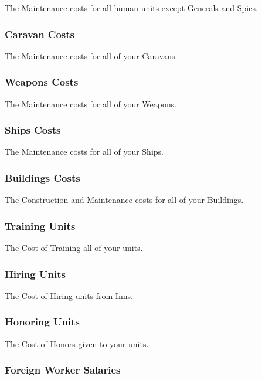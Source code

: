 The Maintenance costs for all human units except Generals and Spies.

\subsubsection{\textsf{Caravan Costs}}

The Maintenance costs for all of your Caravans.

\subsubsection{\textsf{Weapons Costs}}

The Maintenance costs for all of your Weapons.

\subsubsection{\textsf{Ships Costs}}

The Maintenance costs for all of your Ships.

\subsubsection{\textsf{Buildings Costs}}

The Construction and Maintenance costs for all of your Buildings.

\subsubsection{\textsf{Training Units}}

The Cost of Training all of your units.

\subsubsection{\textsf{Hiring Units}}

The Cost of Hiring units from Inns.

\subsubsection{\textsf{Honoring Units}}

The Cost of Honors given to your units.

\subsubsection{\textsf{Foreign Worker Salaries}}


